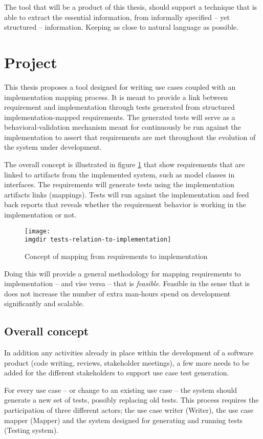 \noindent The tool that will be a product of this thesis, should support a technique that is able to extract the essential information, from informally specified -- yet structured -- information. Keeping as close to natural language as possible.

\section{Project}
This thesis proposes a tool designed for writing use cases coupled with an implementation mapping process. It is meant to provide a link between requirement and implementation through tests generated from structured implementation-mapped requirements. The generated tests will serve as a behavioral-validation mechanism meant for continuously be run against the implementation to assert that requirements are met throughout the evolution of the system under development.\medskip

\noindent The overall concept is illustrated in figure \ref{fig:tests-relation-to-implementation} that show requirements that are linked to artifacts from the implemented system, such as model classes in interfaces. The requirements will generate tests using the implementation artifacts links (mappings). Tests will run against the implementation and feed back reports that reveals whether the requirement behavior is working in the implementation or not.\medskip
\begin{figure}[!htbp]
\centering
\texttt{[image: \\imgdir tests-relation-to-implementation]}
\caption{Concept of mapping from requirements to implementation}
\label{fig:tests-relation-to-implementation}
\end{figure}

\noindent Doing this will provide a general methodology for mapping requirements to implementation -- and vise versa -- that is \emph{feasible}. Feasible in the sense that is does not increase the number of extra man-hours spend on development significantly and scalable. 


\subsection{Overall concept}
In addition any activities already in place within the development of a software product (code writing, reviews, stakeholder meetings), a few more needs to be added for the different stakeholders to support use case test generation.\medskip

\noindent For every use case -- or change to an existing use case -- the system should generate a new set of tests, possibly replacing old tests. This process requires the participation of three different actors; the use case writer (Writer), the use case mapper (Mapper) and the system designed for generating and running tests (Testing system).\medskip

